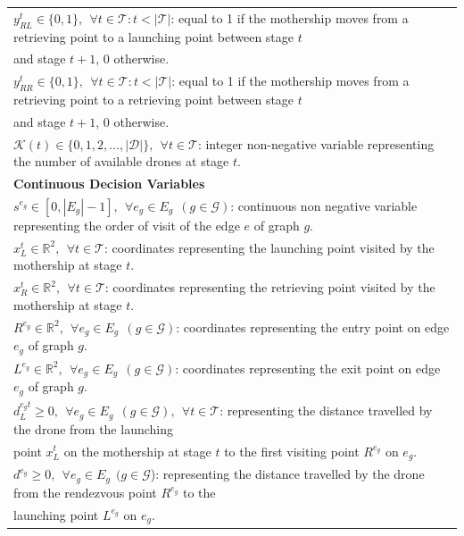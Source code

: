\begin{table}[h!]
\begin{tabular}{|l|}
$y_{RL}^t \in \{0,1\},  \:\: \forall t \in \mathcal T:t<|\mathcal T|$: equal to 1 if the mothership moves from a retrieving point to a launching point between stage $t$\\ \hspace*{1cm} and stage $t+1$, 0 otherwise.\\
$y_{RR}^t \in \{0,1\},  \:\: \forall t \in \mathcal T:t<|\mathcal T|$: equal to 1 if the mothership moves from a retrieving point to a retrieving point between stage $t$\\ \hspace*{1cm} and stage $t+1$, 0 otherwise.\\
$\mathcal{K}(t) \in \{0, 1, 2, \ldots, |\mathcal D|\}, \:\: \forall t \in \mathcal T$: integer non-negative variable representing the number of available drones at stage $t$.\\
\hline
\textbf{Continuous Decision Variables}\\
\hline
$s^{e_g}\in [0, |E_g|-1], \:\: \forall e_g \in E_g\:\: (g \in \mathcal{G})$: continuous non negative variable representing the order of visit of the edge $e$ of graph $g$.\\
$x_L^t\in\mathbb R^2, \:\: \forall t \in \mathcal T$: coordinates representing the launching point visited by the mothership at stage $t$.\\
$x_R^t\in\mathbb R^2, \:\: \forall t \in \mathcal T$: coordinates representing the retrieving point visited by the mothership at stage $t$.\\
$R^{e_g}\in\mathbb R^2, \:\: \forall e_g \in E_g\:\: (g \in \mathcal{G})$: coordinates representing the entry point on edge $e_g$ of graph $g$.\\
$L^{e_g}\in\mathbb R^2, \:\: \forall e_g \in E_g\:\: (g \in \mathcal{G})$: coordinates representing the exit point on edge $e_g$ of graph $g$.\\
$d_L^{e_g t} \geq 0, \:\: \forall e_g \in E_g \:\: (g \in \mathcal{G}), \:\:\forall t \in \mathcal T$: representing the distance travelled by the drone from the launching\\
\hspace*{1cm} point $x_L^t$ on the mothership at stage $t$ to the first visiting point $R^{e_g}$ on $e_g$.\\
$d^{e_g} \geq 0, \:\: \forall e_g \in E_g\:\: (g \in \mathcal{G}$): representing the distance travelled by the drone from the rendezvous point $R^{e_g}$ to the \\
\hspace*{1cm} launching point $L^{e_g}$ on $e_g$. \\

\end{tabular}
\end{table}
